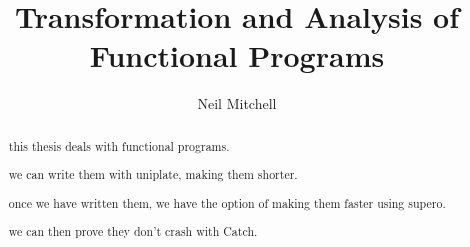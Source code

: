 \author{Neil Mitchell}
\title{Transformation and Analysis of Functional Programs}

\maketitle

\begin{abstract}
this thesis deals with functional programs.

we can write them with uniplate, making them shorter.

once we have written them, we have the option of making them faster using supero.

we can then prove they don't crash with Catch.
\end{abstract}

\tableofcontents
